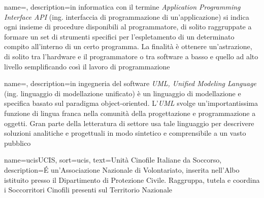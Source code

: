 \makeglossaries
\renewcommand{\acronymname}{Acronimi e abbreviazioni}








\renewcommand{\glossaryname}{Glossario}

{
    name=,
    description={in informatica con il termine \emph{Application Programming Interface API} (ing. interfaccia di programmazione di un'applicazione) si indica ogni insieme di procedure disponibili al programmatore, di solito raggruppate a formare un set di strumenti specifici per l'espletamento di un determinato compito all'interno di un certo programma. La finalità è ottenere un'astrazione, di solito tra l'hardware e il programmatore o tra software a basso e quello ad alto livello semplificando così il lavoro di programmazione}
}

{
    name=,
    description={in ingegneria del software \emph{UML, Unified Modeling Language} (ing. linguaggio di modellazione unificato) è un linguaggio di modellazione e specifica basato sul paradigma object-oriented. L'\emph{UML} svolge un'importantissima funzione di lingua franca nella comunità della progettazione e programmazione a oggetti. Gran parte della letteratura di settore usa tale linguaggio per descrivere soluzioni analitiche e progettuali in modo sintetico e comprensibile a un vasto pubblico}
}

{
    name=\gls{ucis}{UCIS},
    sort=ucis,
    text=Unità Cinofile Italiane da Soccorso,
    description={É un'Associazione Nazionale di Volontariato, inserita nell'Albo istituito presso il Dipartimento di Protezione Civile. Raggruppa, tutela e coordina i Soccorritori Cinofili presenti sul Territorio Nazionale}
}

